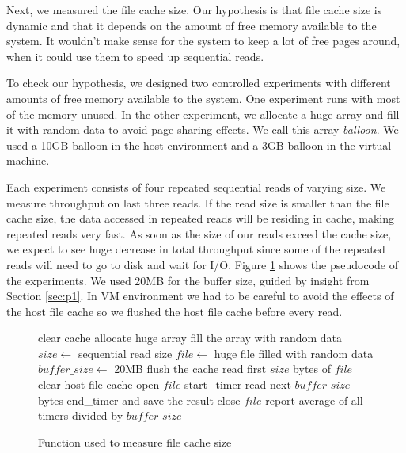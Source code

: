 Next, we measured the file cache size. Our hypothesis is that file cache size is dynamic and that it depends on the amount of free memory available to the system. It wouldn't make sense for the system to keep a lot of free pages around, when it could use them to speed up sequential reads.

To check our hypothesis, we designed two controlled experiments with different amounts of free memory available to the system. One experiment runs with most of the memory unused. In the other experiment, we allocate a huge array and fill it with random data to avoid page sharing effects. We call this array \emph{balloon}. We used a 10GB balloon in the host environment and a 3GB balloon in the virtual machine.

Each experiment consists of four repeated sequential reads of varying size. We measure throughput on last three reads. If the read size is smaller than the file cache size, the data accessed in repeated reads will be residing in cache, making repeated reads very fast. As soon as the size of our reads exceed the cache size, we expect to see huge decrease in total throughput since some of the repeated reads will need to go to disk and wait for I/O. Figure \ref{fig:p3pseudo} shows the pseudocode of the experiments. We used 20MB for the buffer size, guided by insight from Section \ref{sec:p1}. In VM environment we had to be careful to avoid the effects of the host file cache so we flushed the host file cache before every read.

\begin{figure}
\begin{algorithmic}
\STATE clear cache
\STATE allocate huge array
\STATE fill the array with random data
\ENDIF
\STATE $size \leftarrow$ {sequential read size}
\STATE $file \leftarrow$ {huge file filled with random data}
\STATE $buffer\_size \leftarrow$ 20MB
\STATE flush the cache
\STATE read first $size$ bytes of $file$
\STATE clear host file cache
\ENDIF
\STATE open $file$
\STATE start\_timer
\STATE read next $buffer\_size$ bytes
\STATE end\_timer and save the result
\ENDWHILE
\STATE close $file$
\ENDFOR
\STATE report average of all timers divided by $buffer\_size$
\end{algorithmic}
\caption{Function used to measure file cache size}
\label{fig:p3pseudo}
\end{figure}

